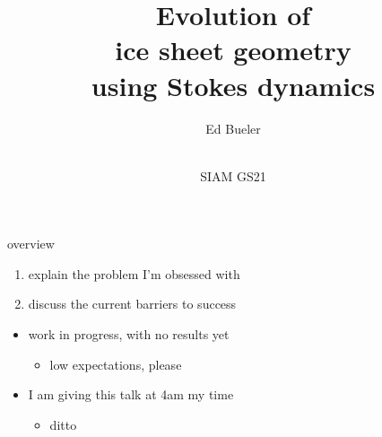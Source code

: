\documentclass[usepdftitle=false,usenames,dvipsnames]{beamer}
\title{Evolution of \\ ice sheet geometry \\ using Stokes dynamics}
\author{Ed Bueler}
\date{\phantom{foo} \bigskip \bigskip \bigskip \\ SIAM GS21}
\begin{document}
\begin{frame}
	\maketitle
\end{frame}


\begin{frame}{overview}
\Large
\begin{enumerate}
\item explain the problem I'm obsessed with
\item discuss the current barriers to success
\end{enumerate}

\normalsize
\vspace{10mm}
\begin{itemize}
\item<2> work in progress, with no results yet
    \begin{itemize}
    \item<2> low expectations, please
    \end{itemize}
\item<2> I am giving this talk at 4am my time
    \begin{itemize}
    \item<2> ditto
    \end{itemize}
\end{itemize}
\end{frame}
\end{document}
